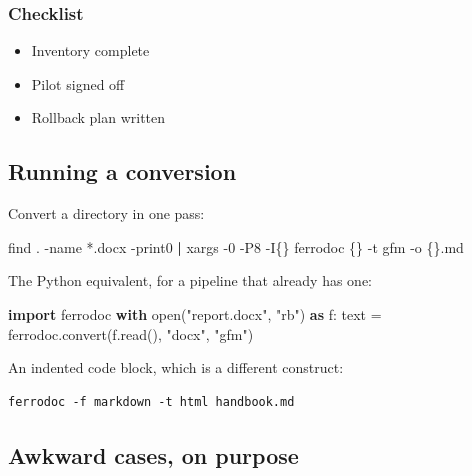 \documentclass[
]{article}
\newenvironment{Shaded}{}{}
\newcommand{\AttributeTok}[1]{\textcolor[rgb]{0.49,0.56,0.16}{#1}}
\newcommand{\BuiltInTok}[1]{\textcolor[rgb]{0.00,0.50,0.00}{#1}}
\newcommand{\ControlFlowTok}[1]{\textcolor[rgb]{0.00,0.44,0.13}{\textbf{#1}}}
\newcommand{\FunctionTok}[1]{\textcolor[rgb]{0.02,0.16,0.49}{#1}}
\newcommand{\ImportTok}[1]{\textcolor[rgb]{0.00,0.50,0.00}{\textbf{#1}}}
\newcommand{\KeywordTok}[1]{\textcolor[rgb]{0.00,0.44,0.13}{\textbf{#1}}}
\newcommand{\NormalTok}[1]{#1}
\newcommand{\OperatorTok}[1]{\textcolor[rgb]{0.40,0.40,0.40}{#1}}
\newcommand{\StringTok}[1]{\textcolor[rgb]{0.25,0.44,0.63}{#1}}
\providecommand{\tightlist}{%
  \setlength{\itemsep}{0pt}\setlength{\parskip}{0pt}}
\begin{document}
\subsubsection{Checklist}\label{checklist}

\begin{itemize}
\tightlist
\item[$\boxtimes$]
  Inventory complete
\item[$\square$]
  Pilot signed off
\item[$\square$]
  Rollback plan written
\end{itemize}

\subsection{Running a conversion}\label{running-a-conversion}

Convert a directory in one pass:

\begin{Shaded}
\begin{Highlighting}[]
\FunctionTok{find}\NormalTok{ . }\AttributeTok{{-}name} \StringTok{\textquotesingle{}*.docx\textquotesingle{}} \AttributeTok{{-}print0} \KeywordTok{|}
  \FunctionTok{xargs} \AttributeTok{{-}0} \AttributeTok{{-}P8} \AttributeTok{{-}I\{\}}\NormalTok{ ferrodoc \{\} }\AttributeTok{{-}t}\NormalTok{ gfm }\AttributeTok{{-}o}\NormalTok{ \{\}.md}
\end{Highlighting}
\end{Shaded}

The Python equivalent, for a pipeline that already has one:

\begin{Shaded}
\begin{Highlighting}[]
\ImportTok{import}\NormalTok{ ferrodoc}
\ControlFlowTok{with} \BuiltInTok{open}\NormalTok{(}\StringTok{"report.docx"}\NormalTok{, }\StringTok{"rb"}\NormalTok{) }\ImportTok{as}\NormalTok{ f:}
\NormalTok{    text }\OperatorTok{=}\NormalTok{ ferrodoc.convert(f.read(), }\StringTok{"docx"}\NormalTok{, }\StringTok{"gfm"}\NormalTok{)}
\end{Highlighting}
\end{Shaded}

An indented code block, which is a different construct:

\begin{verbatim}
ferrodoc -f markdown -t html handbook.md
\end{verbatim}

\subsection{Awkward cases, on purpose}\label{awkward-cases-on-purpose}
\end{document}
